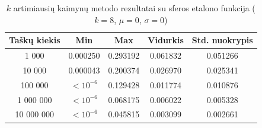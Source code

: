 \begin{table}[H]
    \centering
    \begin{tabular}{|c|c|c|c|c|}
        \hline
        \textbf{Taškų kiekis} & \textbf{Min} & \textbf{Max} & \textbf{Vidurkis} & \textbf{Std. nuokrypis} \\ \hline
        1 000        & 0.000250 & 0.293192 & 0.061832 & 0.051266 \\ \hline
        10 000       & 0.000043 & 0.200374 & 0.026970 & 0.025341 \\ \hline
        100 000      & $<10^{-6}$ & 0.129428 & 0.011774 & 0.010876 \\ \hline
        1 000 000    & $<10^{-6}$ & 0.068175 & 0.006022 & 0.005328 \\ \hline
        10 000 000   & $<10^{-6}$ & 0.045815 & 0.003099 & 0.002661 \\ \hline
    \end{tabular}
    \caption{$k$ artimiausių kaimynų metodo rezultatai su sferos etalono funkcija ($k = 8$, $\mu = 0$, $\sigma = 0$)}
\end{table}